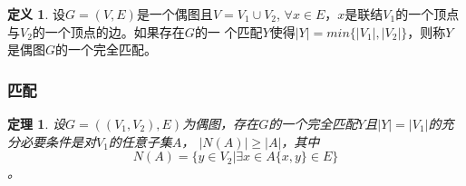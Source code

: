 \documentclass{beamer}
\newtheorem{Thm}{定理}[section]
\theoremstyle{definition}
\newtheorem{Def}{定义}[section]
\theoremstyle{example}
\begin{document}
\begin{CJK}{UTF8}{gbsn}
\begin{frame}
  \begin{Def}
    设$G=(V,E)$是一个偶图且$V=V_1\cup V_2$,
    $\forall x \in
    E$，$x$是联结$V_1$的一个顶点与$V_2$的一个顶点的边。如果存在$G$的一
    个匹配$Y$使得$|Y|=min\{|V_1|,|V_2|\}$，则称$Y$是偶图$G$的一个\alert{完全匹配}。
  \end{Def}

\end{frame}

\begin{frame}
  \frametitle{匹配}
  \begin{Thm}
    设$G=((V_1,V_2),E)$为偶图，存在$G$的一个完全匹配$Y$且$|Y| = |V_1|$的充分必要条件是对$V_1$的任意子集$A$， $|N(A)| \geq |A|$，其中\[N(A) = \{y\in V_2|\exists x \in A \{x,y\} \in E\}\]。
  \end{Thm}
\end{frame}

\end{CJK}
\end{document}
